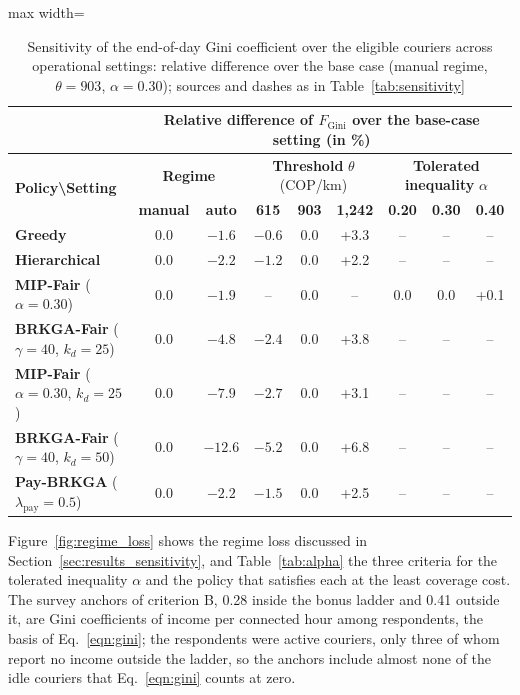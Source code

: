 \documentclass[a4paper,11pt,review,3p,authoryear]{elsarticle}
\newcommand{\FG}{F_{\text{Gini}}}
\begin{document}
\begin{table}[htbp]
\centering
\scriptsize
\begin{adjustbox}{max width=\textwidth}
\setlength{\tabcolsep}{4pt}
\renewcommand{\arraystretch}{1.15}
\begin{tabular}{l|cc|ccc|ccc}
\hline
\multicolumn{1}{c}{} & \multicolumn{8}{c}{\textbf{Relative difference of $\FG$ over the base-case setting (in \%)}} \\
\hline
\multirow{2}{*}{\textbf{Policy\textbackslash Setting}}
& \multicolumn{2}{c|}{\textbf{Regime}}
& \multicolumn{3}{c|}{\textbf{Threshold} $\theta$ (COP/km)}
& \multicolumn{3}{c}{\textbf{Tolerated inequality} $\alpha$} \\
\cline{2-9}
& \textbf{manual} & \textbf{auto} & \textbf{615} & \textbf{903} & \textbf{1,242} & \textbf{0.20} & \textbf{0.30} & \textbf{0.40} \\
\hline
\textbf{Greedy} & 0.0 & $-1.6$ & $-0.6$ & 0.0 & +3.3 & -- & -- & -- \\
\textbf{Hierarchical} & 0.0 & $-2.2$ & $-1.2$ & 0.0 & +2.2 & -- & -- & -- \\
\textbf{MIP-Fair} ($\alpha = 0.30$) & 0.0 & $-1.9$ & -- & 0.0 & -- & 0.0 & 0.0 & +0.1 \\
\textbf{BRKGA-Fair} ($\gamma = 40$, $k_d = 25$) & 0.0 & $-4.8$ & $-2.4$ & 0.0 & +3.8 & -- & -- & -- \\
\textbf{MIP-Fair} ($\alpha = 0.30$, $k_d = 25$) & 0.0 & $-7.9$ & $-2.7$ & 0.0 & +3.1 & -- & -- & -- \\
\textbf{BRKGA-Fair} ($\gamma = 40$, $k_d = 50$) & 0.0 & $-12.6$ & $-5.2$ & 0.0 & +6.8 & -- & -- & -- \\
\textbf{Pay-BRKGA} ($\lambda_{\text{pay}} = 0.5$) & 0.0 & $-2.2$ & $-1.5$ & 0.0 & +2.5 & -- & -- & -- \\
\hline
\end{tabular}
\end{adjustbox}
\caption{Sensitivity of the end-of-day Gini coefficient over the eligible couriers across operational settings: relative difference over the base case (manual regime, $\theta = 903$, $\alpha = 0.30$); sources and dashes as in Table~\ref{tab:sensitivity}}
\label{tab:sensitivity_gini}
\end{table}

Figure~\ref{fig:regime_loss} shows the regime loss discussed in Section~\ref{sec:results_sensitivity}, and Table~\ref{tab:alpha} the three criteria for the tolerated inequality $\alpha$ and the policy that satisfies each at the least coverage cost. The survey anchors of criterion B, 0.28 inside the bonus ladder and 0.41 outside it, are Gini coefficients of income per connected hour among respondents, the basis of Eq.~\eqref{eqn:gini}; the respondents were active couriers, only three of whom report no income outside the ladder, so the anchors include almost none of the idle couriers that Eq.~\eqref{eqn:gini} counts at zero.
\end{document}
